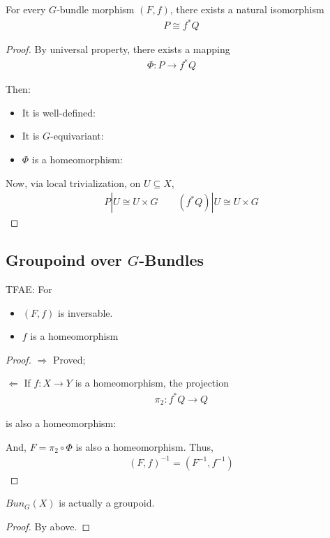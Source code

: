 \documentclass[Total.tex]{subfiles}
\begin{document}
				\begin{lemma}
					For every $G$-bundle morphism $(F,f)$, there exists a natural isomorphism
					\begin{gather*}
						P\cong f^*Q
					\end{gather*}
				\end{lemma}
				\begin{proof}
					By universal property, there exists a mapping
					\begin{gather*}
						\Phi:P\rightarrow f^*Q\qquad 
					\end{gather*}
					
					Then:
					\begin{itemize}
						\item It is well-defined:
						\item It is $G$-equivariant:
						\item $\Phi$ is a homeomorphism:
					\end{itemize}
					
					Now, via local trivialization, on $U\subseteq X$,
					\begin{gather*}
						P|U\cong U\times G\qquad (f^*Q)|U\cong U\times G
					\end{gather*}
				\end{proof}
			\subsection{Groupoind over $G$-Bundles}
			\begin{proposition}
				TFAE: For \begin{center}
				\end{center}
				\begin{itemize}
					\item $(F,f)$ is inversable. 
					\item $f$ is a homeomorphism
				\end{itemize}
			\end{proposition}
			\begin{proof}
				$\Rightarrow$ Proved;
				
				$\Leftarrow$ If $f:X\rightarrow Y$ is a homeomorphism, the projection
				\begin{gather*}
					\pi_2:f^*Q\rightarrow Q
				\end{gather*}
				
				is also a homeomorphism:
				
				
				And, $F=\pi_2\circ \Phi$ is also a homeomorphism. Thus, 
				\begin{gather*}
					(F,f)^{-1}=(F^{-1},f^{-1})
				\end{gather*}
			\end{proof}
				\begin{proposition}
					$Bun_G(X)$ is actually a groupoid. 
				\end{proposition}
				\begin{proof}
					By above. 
				\end{proof}
				
\end{document}
